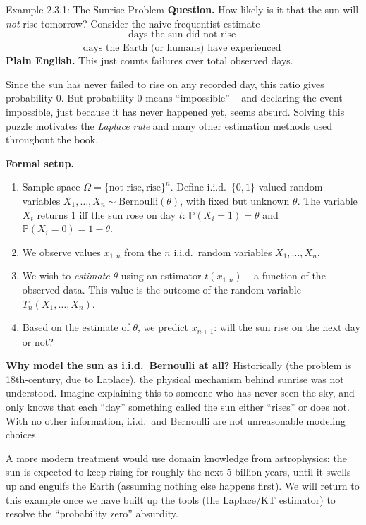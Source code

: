 \documentclass[aspectratio=169,10pt]{beamer}
\begin{document}
\begin{frame}[allowframebreaks]{Example 2.3.1: The Sunrise Problem}
  \textbf{Question.} How likely is it that the sun will \emph{not} rise
  tomorrow? Consider the naive frequentist estimate
  \[
    \frac{\text{days the sun did not rise}}{\text{days the Earth (or humans) have experienced}}.
  \]
  \textbf{Plain English.} This just counts failures over total observed days.

  Since the sun has never failed to rise on any recorded day, this ratio
  gives probability $0$. But probability $0$ means ``impossible'' -- and
  declaring the event impossible, just because it has never happened yet,
  seems absurd. Solving this puzzle motivates the \emph{Laplace rule} and
  many other estimation methods used throughout the book.

  \framebreak

  \textbf{Formal setup.}
  \begin{enumerate}
    \item Sample space $\Omega = \{\text{not rise}, \text{rise}\}^n$. Define
      i.i.d.\ $\{0,1\}$-valued random variables $X_1,\dots,X_n \sim
      \mathrm{Bernoulli}(\theta)$, with fixed but unknown $\theta$. The
      variable $X_t$ returns $1$ iff the sun rose on day $t$:
      $\mathbb{P}(X_i=1)=\theta$ and $\mathbb{P}(X_i=0)=1-\theta$.
    \item We observe values $x_{1:n}$ from the $n$ i.i.d.\ random variables
      $X_1,\dots,X_n$.
    \item We wish to \emph{estimate} $\theta$ using an estimator
      $t(x_{1:n})$ -- a function of the observed data. This value is the
      outcome of the random variable $T_n(X_1,\dots,X_n)$.
    \item Based on the estimate of $\theta$, we predict $x_{n+1}$: will the
      sun rise on the next day or not?
  \end{enumerate}

  \framebreak

  \textbf{Why model the sun as i.i.d.\ Bernoulli at all?} Historically (the
  problem is 18th-century, due to Laplace), the physical mechanism behind
  sunrise was not understood. Imagine explaining this to someone who has
  never seen the sky, and only knows that each ``day'' something called the
  sun either ``rises'' or does not. With no other information, i.i.d.\ and
  Bernoulli are not unreasonable modeling choices.

  A more modern treatment would use domain knowledge from astrophysics: the
  sun is expected to keep rising for roughly the next $5$ billion years,
  until it swells up and engulfs the Earth (assuming nothing else happens
  first). We will return to this example once we have built up the tools
  (the Laplace/KT estimator) to resolve the ``probability zero'' absurdity.
\end{frame}
\end{document}
